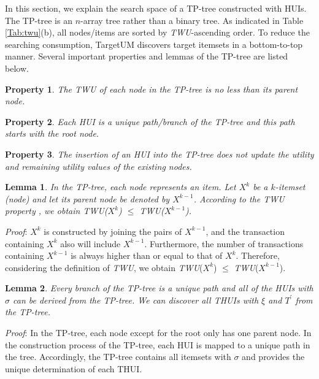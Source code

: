 \documentclass[journal]{IEEEtran}
\newtheorem{property}{Property}[section]
\newtheorem{lemma}{Lemma}  %
\begin{document}
In this section, we explain the search space of a TP-tree constructed with HUIs. The TP-tree is an $n$-array tree rather than a binary tree. As indicated in Table \ref{Tab:twu}(b), all nodes/items are sorted by \textit{TWU}-ascending order. To reduce the searching consumption, TargetUM discovers target itemsets in a bottom-to-top manner. Several important properties and lemmas of the TP-tree are listed below.


\begin{property}
	\rm The \textit{TWU} of each node in the TP-tree is no less than its parent node.
\end{property}

\begin{property}
	\rm Each HUI is a unique path/branch of the TP-tree and this path starts with the root node.
\end{property}

\begin{property}
	\rm The insertion of an HUI into the TP-tree does not update the utility and remaining utility values of the existing nodes.
\end{property}

\begin{lemma} 
	\rm In the TP-tree, each node represents an item. Let $X^k$ be a $k$-itemset (node) and let its parent node be denoted by $X^{k-1}$. According to the TWU property \cite{liu2005two}, we obtain \textit{TWU}($X^k$) $\le$ \textit{TWU}($X^{k-1}$).
\end{lemma}

\textit{Proof}: $X^k$ is constructed by joining the pairs of $X^{k-1}$, and the transaction containing $X^k$ also will include $X^{k-1}$. Furthermore, the number of transactions containing $X^{k-1}$ is always higher than or equal to that of $X^k$. Therefore, considering the definition of \textit{TWU}, we obtain \textit{TWU}($X^k$) $\le$ \textit{TWU}($X^{k-1}$).


\begin{lemma} 
	\rm Every branch of the TP-tree is a unique path and all of the HUIs with $\sigma$ can be derived from the TP-tree. We can discover all THUIs with $\xi$ and $T^\prime$ from the TP-tree.
\end{lemma}

\textit{Proof}: In the TP-tree, each node except for the root only has one parent node. In the construction process of the TP-tree, each HUI is mapped to a unique path in the tree. Accordingly, the TP-tree contains all itemsets with $\sigma$ and provides the unique determination of each THUI.
\end{document}
